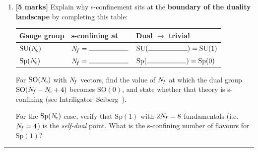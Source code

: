 \documentclass[11pt,a4paper]{article}
\newcommand{\SO}[1]{\mathrm{SO}(#1)}
\newcommand{\Sp}[1]{\mathrm{Sp}(#1)}
\begin{document}
\begin{enumerate}[label=(\alph*)]
  \item \textbf{[5 marks]}
    Explain why s-confinement sits at the \textbf{boundary of the
    duality landscape} by completing this table:

    \renewcommand{\arraystretch}{1.3}
    \begin{center}
    \begin{tabular}{@{}l l l@{}}
    \toprule
    \textbf{Gauge group} & \textbf{s-confining at} &
      \textbf{Dual $\to$ trivial} \\
    \midrule
    $\mathrm{SU}(N_{\!c})$ & $\Nf = \rule{2cm}{0.4pt}$ &
      $\SU{\rule{2cm}{0.4pt}} = \SU{1}$ \\
    $\Sp{\Nc}$ & $\Nf = \rule{2cm}{0.4pt}$ &
      $\Sp{\rule{2cm}{0.4pt}} = \Sp{0}$ \\
    \bottomrule
    \end{tabular}
    \end{center}

    For $\SO{\Nc}$ with $N_{\!f}$ vectors, find the value of $N_{\!f}$ at which
    the dual group $\SO{\Nf - \Nc + 4}$ becomes $\SO{0}$, and state
    whether that theory is s-confining (see
    Intriligator--Seiberg~\cite{IS9506101}).

    For the $\Sp{\Nc}$ case, verify that $\Sp{1}$ with
    $2N_{\!f} = 8$ fundamentals (i.e.\ $N_{\!f} = 4$) is the
    \emph{self-dual} point.  What is the s-confining
    number of flavours for $\Sp{1}$?

\end{enumerate}

\bigskip
\hrule
\bigskip
\end{document}
